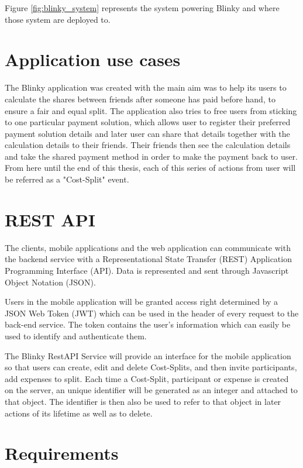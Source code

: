 Figure \ref{fig:blinky_system} represents the system powering Blinky and where those system are deployed to. 

\section{Application use cases}

The Blinky application was created with the main aim was to help its users to calculate the shares between friends after someone has paid before hand, to ensure a fair and equal split. The application also tries to free users from sticking to one particular payment solution, which allows user to register their preferred payment solution details and later user can share that details together with the calculation details to their friends. Their friends then see the calculation details and take the shared payment method in order to make the payment back to user. From here until the end of this thesis, each of this series of actions from user will be referred as a "Cost-Split" event.

\section{REST API}

The clients, mobile applications and the web application  can communicate with the backend service with a Representational State Transfer (REST)  \citep{REST} Application Programming Interface (API). Data is represented and sent through Javascript Object Notation (JSON).

Users in the mobile application will be granted access right determined by a JSON Web Token (JWT) which can be used in the header of every request to the back-end service. The token contains the user's information which  can easily be used to identify and authenticate them.

The Blinky RestAPI Service will provide an interface for the mobile application so that users can create, edit and delete Cost-Splits, and then invite participants, add expenses to split. Each time a Cost-Split, participant or expense is created on the server, an unique identifier will be generated as an integer and attached to that object. The identifier is then also be used to refer to that object in later actions of its lifetime as well as to delete.
\label{blinkyAPI}

\section{Requirements}
\label{section:requirements}


